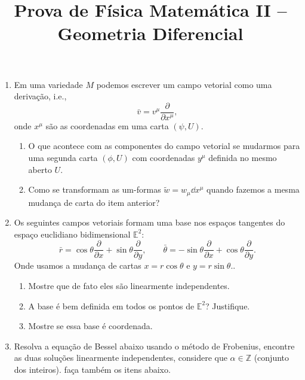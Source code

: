 \newif\ifuseseminar
\useseminartrue


\title{Prova de Física Matemática II -- Geometria Diferencial}



\begin{enumerate}
	\item Em uma variedade $M$ podemos escrever um campo vetorial como uma derivação,
	      i.e.,
	      \begin{equation}
		      \bar{v} = v^\mu \frac{\partial}{\partial x^\mu},
	      \end{equation}
	      onde $x^\mu$ são as coordenadas em uma carta $(\psi, U)$.
	      \begin{enumerate}
		      \item O que acontece com as componentes do campo vetorial se mudarmos para
		            uma segunda carta $(\phi,U)$ com coordenadas $y^\mu$ definida no mesmo
		            aberto $U$.
		      \item Como se transformam as um-formas $\tilde{w}=w_\mu\dd x^\mu$ quando
		            fazemos a mesma mudança de carta do item anterior?
	      \end{enumerate}
	\item Os seguintes campos vetoriais formam uma base nos espaços tangentes do espaço
	      euclidiano bidimensional $\mathbb{E}^2$:
	      \begin{equation}
		      \bar{r} = \cos\theta \frac{\partial}{\partial x}+\sin\theta
		      \frac{\partial}{\partial y}, \qquad \bar{\theta} = -\sin\theta
		      \frac{\partial}{\partial x}+\cos\theta \frac{\partial}{\partial y}.
	      \end{equation}
	      Onde usamos a mudança de cartas $x=r\cos\theta$ e $y=r\sin\theta$..
	      \begin{enumerate}
		      \item Mostre que de fato eles são linearmente independentes.
		      \item A base é bem definida em todos os pontos de $\mathbb{E}^2$? Justifique.
		      \item Mostre se essa base é coordenada.
	      \end{enumerate}
	\item Resolva a equação de Bessel abaixo usando o método de Frobenius, encontre as
	      duas soluções linearmente independentes, considere que $\alpha \in \mathbb{Z}$
	      (conjunto dos inteiros). faça também os itens abaixo.
	      \begin{equation}\label{eq:bessel}

\end{equation}
\end{enumerate}
